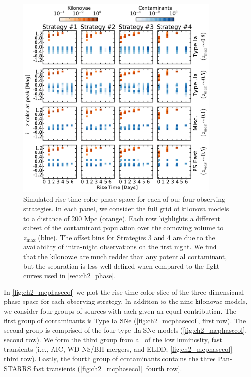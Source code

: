 \begin{figure}[t!]
\centering
\includegraphics[width=0.9\textwidth]{./figs/chapter2/ch2_f8.pdf}
\caption{Simulated rise time-color phase-space for each of our four observing strategies. In each panel, we consider the full grid of kilonova models to a distance of 200 Mpc (orange). Each row highlights a different subset of the contaminant population over the comoving volume to $z_{\text{max}}$ (blue). The offset bins for Strategies 3 and 4 are due to the availability of intra-night observations on the first night. We find that the kilonovae are much redder than any potential contaminant, but the separation is less well-defined when compared to the light curves used in \autoref{sec:ch2_phase}.}
\label{fig:ch2_mcphasecol}
\end{figure}

In \autoref{fig:ch2_mcphasecol} we plot the rise time-color slice of the three-dimensional phase-space for each observing strategy. In addition to the nine kilonovae models, we consider four groups of sources with each given an equal contribution. The first group of contaminants is Type Ia SNe (\autoref{fig:ch2_mcphasecol}, first row). The second group is comprised of the four type .Ia SNe models (\autoref{fig:ch2_mcphasecol}, second row). We form the third group from all of the low luminosity, fast transients (i.e., AIC, WD-NS/BH mergers, and ELDD; \autoref{fig:ch2_mcphasecol}, third row). Lastly, the fourth group of contaminants contains the three Pan-STARRS fast transients (\autoref{fig:ch2_mcphasecol}, fourth row).

